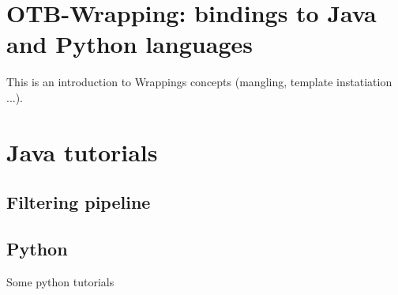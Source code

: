 \section{OTB-Wrapping: bindings to Java and Python languages}

This is an introduction to Wrappings concepts (mangling, template instatiation ...).

\section{Java tutorials}

\subsection{Filtering pipeline}



\subsection{Python}

Some python tutorials